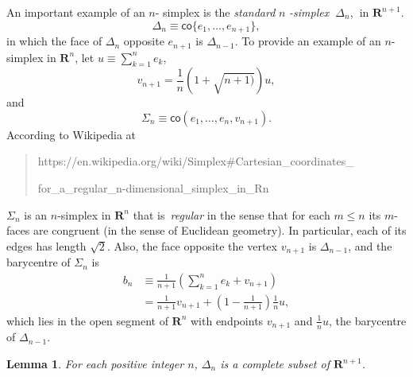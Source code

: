 \documentclass[11pt]{article}%
\newtheorem{lemma}[theorem]{Lemma}
\begin{document}
An important example of an $n$- simplex is the \emph{standard }$n$%
\emph{-simplex}\textbf{\ }$\Delta_{n}$,\textbf{\ }in $\mathbf{R}^{n+1}$.
\[
\Delta_{n}\equiv\mathsf{co}\{e_{1},\ldots,e_{n+1}\},
\]
in which the face of $\Delta_{n}$ opposite $e_{n+1}$ is $\Delta_{n-1}$. To
provide an example of an $n$-simplex in $\mathbf{R}^{n}$, let $u\equiv
\sum_{k=1}^{n}e_{k}$,%
\begin{equation}
v_{n+1}=\frac{1}{n}\left(  1+\sqrt{n+1)}\right)  u, \label{dd1}%
\end{equation}
and%
\[
\Sigma_{n}\equiv\mathsf{co}(e_{1},\ldots,e_{n},v_{n+1}).
\]
According to Wikipedia at

\begin{quote}
{\small https://en.wikipedia.org/wiki/Simplex\#Cartesian\_coordinates\_}

{\small for\_a\_regular\_n-dimensional\_simplex\_in\_Rn}
\end{quote}

%

\noindent
$\Sigma_{n}$ is an $n$-simplex in $\mathbf{R}^{n}$ that is\emph{\ regular} in
the sense that for each $m\leq n$ its $m$-faces are congruent (in the sense of
Euclidean geometry). In particular, each of its edges has length $\sqrt{2}$.
Also, the face opposite the vertex $v_{n+1}$ is $\Delta_{n-1}$, and the
barycentre of $\Sigma_{n}$ is%
\begin{align}
b_{n}  &  \equiv\frac{1}{n+1}\left(  \sum_{k=1}^{n}e_{k}+v_{n+1}\right)
\nonumber\\
&  =\frac{1}{n+1}v_{n+1}+\left(  1-\frac{1}{n+1}\right)  \frac{1}{n}u,
\label{ee1}%
\end{align}
which lies in the open segment of $\mathbf{R}^{n}$ with endpoints $v_{n+1}$
and $\frac{1}{n}u$, the barycentre of $\Delta_{n-1}$.

\begin{lemma}
\label{jul17l1}For each positive integer $n$, $\Delta_{n}$ is a complete
subset of $\mathbf{R}^{n+1}$.
\end{lemma}
\end{document}
